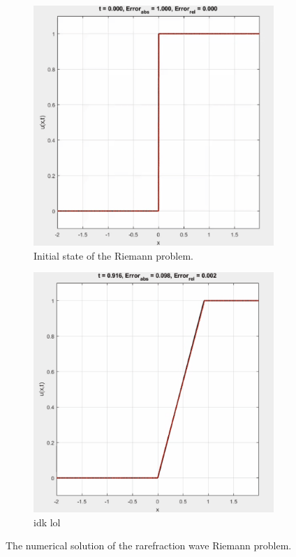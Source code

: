 \documentclass{myproject}
\begin{document}
\begin{figure}
\centering
    \begin{subfigure}{.48\textwidth}
        \centering
        \includegraphics[width=1.0\textwidth]{t0_rarefraction.png}
        \caption{Initial state of the Riemann problem.}
    \end{subfigure}\hfill
    \begin{subfigure}{.48\textwidth}
        \centering
        \includegraphics[width=1\textwidth]{t1_rarefraction.png}
        \caption{idk lol}
    \end{subfigure}
    \caption{The numerical solution of the rarefraction wave Riemann problem.}
\end{figure}
\end{document}
